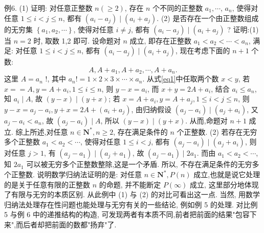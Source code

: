 例6. (1) 证明: 对任意正整数 $n(\geqslant 2)$, 存在 $n$ 个不同的正整数 $a_1, \cdots$, $a_n$, 使得对任意 $1 \leqslant i<j \leqslant n$, 都有 $\left(a_i-a_j\right) \mid\left(a_i+a_j\right)$.
(2) 是否存在一个由正整数组成的无穷集 $\left\{a_1, a_2, \cdots\right\}$, 使得对任意 $i \neq j$, 都有 $\left(a_i-a_j\right) \mid\left(a_i+a_j\right)$ ?
证明:(1) 当 $n=2$ 时, 取数 1,2 即可.
设命题对 $n$ 成立, 即存在正整数 $a_1<a_2<\cdots<a_n$, 满足: 对任意 $1 \leqslant i< j \leqslant n$, 都有 $\left(a_i-a_j\right) \mid\left(a_i+a_j\right)$, 现在考虑下面的 $n+1$ 个数:
$$
A, A+a_1, A+a_2, \cdots, A+a_n . \label{eq1}
$$
这里 $A=a_n$ !, 其中 $a_{n} !=1 \times 2 \times 3 \times \cdots \times a_n$.
从式\ref{eq1}中任取两个数 $x<y$, 若 $x==A, y=A+a_i, 1 \leqslant i \leqslant n$, 则 $y-x= a_i$, 而 $x+y=2 A+a_i$, 结合 $a_i \leqslant a_n$, 知 $a_i \mid A$, 故 $(y-x) \mid(y+x)$; 若 $x= A+a_i, y=A+a_j, 1 \leqslant i<j \leqslant n$, 则 $y-x=a_j-a_i, y+x=2 A+\left(a_i+\right. \left.a_j\right)$, 由归纳假设 $\left(a_j-a_i\right) \mid\left(a_j+a_i\right)$, 又 $a_j-a_i<a_n$, 故 $\left(a_j-a_i\right) \mid A$, 所以 $(y-x) \mid(y+x)$. 从而,命题对 $n+1$ 成立.
综上所述,对任意 $n \in \mathbf{N}^*, n \geqslant 2$, 存在满足条件的 $n$ 个正整数.
(2) 若存在无穷多个正整数 $a_1<a_2<\cdots$, 使得对任意 $1 \leqslant i<j$, 都有 $\left(a_j-a_i\right) \mid\left(a_j+a_i\right)$, 则对任意 $j>1$, 有 $\left(a_j-a_1\right) \mid\left(a_j+a_1\right)$, 故 $\left(a_j-a_1\right) \mid 2 a_1$. 而由 $a_1<a_2<\cdots$, 知 $2 a_1$ 可以被无穷多个正整数整除,这是一个矛盾.
所以, 不存在满足条件的无穷多个正整数.
说明数学归纳法证明的是: 对任意 $n \in \mathbf{N}^*, P(n)$ 成立,也就是说它处理的是关于任意有限的正整数 $n$ 的命题, 并不能断定 $P(\infty)$ 成立, 这里部分地体现了有限与无穷的本质区别.
从此例中 (1) 与 (2) 的对比可看出这一点.
当然, 用数学归纳法处理存在性问题也能处理与无穷有关的一些结论, 例如例 5 的处理.
对比例 5 与例 6 中的递推结构的构造, 可发现两者有本质不同,前者把前面的结果"包容下来",而后者却把前面的数都"扬弃"了.


